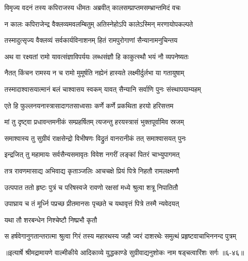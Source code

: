 \twolineshloka
{विमृज्य वदनं तस्य कपिराजस्य धीमतः}
{अब्रवीत् कालसम्प्राप्तमसम्भ्रान्तमिदं वचः} %

\twolineshloka
{न कालः कपिराजेन्द्र वैक्लव्यमवलम्बितुम्}
{अतिस्नेहोऽपि कालेऽस्मिन् मरणायोपकल्पते} %

\twolineshloka
{तस्मादुत्सृज्य वैक्लव्यं सर्वकार्यविनाशनम्}
{हितं रामपुरोगाणां सैन्यानामनुचिन्तय} %

\twolineshloka
{अथ वा रक्ष्यतां रामो यावत्संज्ञाविपर्ययः}
{लब्धसंज्ञौ हि काकुत्स्थौ भयं नौ व्यपनेष्यतः} %

\twolineshloka
{नैतत् किंचन रामस्य न च रामो मुमूर्षति}
{नह्येनं हास्यते लक्ष्मीर्दुर्लभा या गतायुषाम्} %

\twolineshloka
{तस्मादाश्वासयात्मानं बलं चाश्वासय स्वकम्}
{यावत् सैन्यानि सर्वाणि पुनः संस्थापयाम्यहम्} %

\twolineshloka
{एते हि फुल्लनयनास्त्रासादागतसाध्वसाः}
{कर्णे कर्णे प्रकथिता हरयो हरिसत्तम} %

\twolineshloka
{मां तु दृष्ट्वा प्रधावन्तमनीकं सम्प्रहर्षितम्}
{त्यजन्तु हरयस्त्रासं भुक्तपूर्वामिव स्रजम्} %

\twolineshloka
{समाश्वास्य तु सुग्रीवं राक्षसेन्द्रो विभीषणः}
{विद्रुतं वानरानीकं तत् समाश्वासयत् पुनः} %

\twolineshloka
{इन्द्रजित् तु महामायः सर्वसैन्यसमावृतः}
{विवेश नगरीं लङ्कां पितरं चाभ्युपागमत्} %

\twolineshloka
{तत्र रावणमासाद्य अभिवाद्य कृताञ्जलिः}
{आचचक्षे प्रियं पित्रे निहतौ रामलक्ष्मणौ} %

\twolineshloka
{उत्पपात ततो हृष्टः पुत्रं च परिषस्वजे}
{रावणो रक्षसां मध्ये श्रुत्वा शत्रू निपातितौ} %

\twolineshloka
{उपाघ्राय च तं मूर्ध्नि पप्रच्छ प्रीतमानसः}
{पृच्छते च यथावृत्तं पित्रे तस्मै न्यवेदयत्} %

\onelineshloka
{यथा तौ शरबन्धेन निश्चेष्टौ निष्प्रभौ कृतौ} %

\twolineshloka
{स हर्षवेगानुगतान्तरात्मा श्रुत्वा गिरं तस्य महारथस्य}
{जहौ ज्वरं दाशरथेः समुत्थं प्रहृष्टवाचाभिननन्द पुत्रम्} %


॥इत्यार्षे श्रीमद्रामायणे वाल्मीकीये आदिकाव्ये युद्धकाण्डे सुग्रीवाद्यनुशोकः नाम षड्चत्वारिंशः सर्गः ॥६-४६॥
